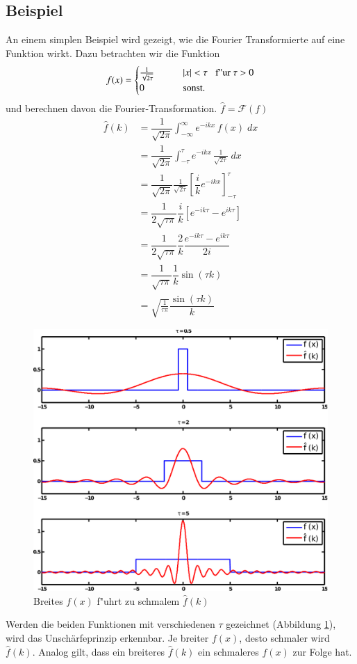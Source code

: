 \begin{refsection}
\subsection{Beispiel}

An einem simplen Beispiel wird gezeigt, wie die Fourier Transformierte auf eine Funktion wirkt. Dazu betrachten wir die Funktion
\begin{equation}
f(x)=\begin{cases}
    \frac{1}{\sqrt{2\tau}}       & \qquad |x|< \tau \;\;\; \textnormal{f"ur }  \tau > 0\\
    0  & \qquad\text{sonst.}\\
  \end{cases}
\end{equation}
und berechnen davon die Fourier-Transformation. $\hat{f}=\mathcal{F}(f)$
\begin{align}
\hat{f}(k)
&=\dfrac{1}{\sqrt{2\pi}}\int_{-\infty}^{\infty}e^{-i k x} \, f(x) \; dx\\
&=\dfrac{1}{\sqrt{2\pi}}\int_{-\tau}^{\tau}e^{-i k x} \, \frac{1}{\sqrt{2\tau}} \; dx\\
&=\dfrac{1}{\sqrt{2\pi}}\frac{1}{\sqrt{2\tau}}\left[ \dfrac{i}{k}e^{-ik x}\right]_{-\tau}^{\tau}\\
&=\dfrac{1}{2\sqrt{\tau\pi}}\dfrac{i}{k}\left[e^{-ik \tau} - e^{ik \tau}\right]\\
&=\dfrac{1}{2\sqrt{\tau\pi}}\dfrac{2}{k}\dfrac{e^{-ik \tau} - e^{ik \tau}}{2i}\\
&=\dfrac{1}{\sqrt{\tau\pi}}\dfrac{1}{k}\sin(\tau k)\\
&=\sqrt{\frac{1}{\tau\pi}}\dfrac{\sin(\tau k)}{k}
\end{align}
\begin{figure}
 \centering
 \includegraphics[width=12cm]{heisenberg/fourier_unschaerfeprinzip.pdf}
 \caption{Breites $f(x)$ f"uhrt zu schmalem $\hat{f}(k)$}
 \label{abb:unschaerfeprinzip}
\end{figure}
Werden die beiden Funktionen mit verschiedenen $\tau$ gezeichnet (Abbildung \ref{abb:unschaerfeprinzip}), wird das Unsch\"arfeprinzip erkennbar. Je breiter $f(x)$, desto schmaler wird $\hat{f}(k)$. Analog gilt, dass ein breiteres $\hat{f}(k)$ ein schmaleres $f(x)$ zur Folge hat.


\end{refsection}
